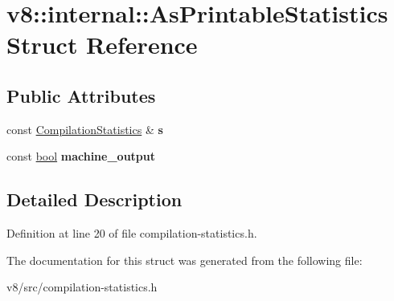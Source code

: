 \hypertarget{structv8_1_1internal_1_1AsPrintableStatistics}{}\section{v8\+:\+:internal\+:\+:As\+Printable\+Statistics Struct Reference}
\label{structv8_1_1internal_1_1AsPrintableStatistics}
\subsection*{Public Attributes}
\begin{DoxyCompactItemize}
\item 
\mbox{\label{structv8_1_1internal_1_1AsPrintableStatistics_ab63a82a3f39a0a3e40cce24aa67e28ad}} 
const \mbox{\hyperlink{classv8_1_1internal_1_1CompilationStatistics}{Compilation\+Statistics}} \& {\bfseries s}
\item 
\mbox{\label{structv8_1_1internal_1_1AsPrintableStatistics_aa5786feed220729013fa5063e2b4aea8}} 
const \mbox{\hyperlink{classbool}{bool}} {\bfseries machine\+\_\+output}
\end{DoxyCompactItemize}


\subsection{Detailed Description}


Definition at line 20 of file compilation-\/statistics.\+h.



The documentation for this struct was generated from the following file\+:\begin{DoxyCompactItemize}
\item 
v8/src/compilation-\/statistics.\+h\end{DoxyCompactItemize}
